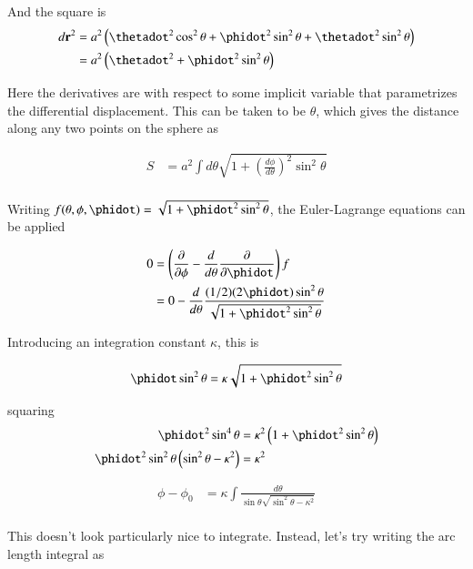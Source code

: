 And the square is
\begin{align*}
d\Br^2
&= a^2 \left( \thetadot^2 \cos^2\theta + \phidot^2 \sin^2\theta + \thetadot^2 \sin^2\theta \right) \\
&= a^2 \left( \thetadot^2 + \phidot^2 \sin^2\theta \right) \\
\end{align*}

Here the derivatives are with respect to some implicit variable that parametrizes the differential displacement.
This can be taken to be $\theta$, which gives the distance along any two points on the sphere as

\begin{align*}
S &= a^2 \int d\theta \sqrt{1 + \left(\frac{d\phi}{d\theta}\right)^2 \sin^2\theta } \\
\end{align*}

Writing $f(\theta, \phi, \phidot) = \sqrt{1 + \phidot^2 \sin^2\theta}$, the Euler-Lagrange equations can be
applied

\begin{align*}
0 
&= \left( \PD{\phi}{} - \frac{d}{d\theta} \PD{\phidot}{} \right) f \\
&= 0 - \frac{d}{d\theta} \frac{(1/2)(2\phidot) \sin^2\theta}{\sqrt{1 + \phidot^2 \sin^2\theta}} \\
\end{align*}

Introducing an integration constant $\kappa$, this is

\begin{align*}
\phidot \sin^2\theta = \kappa \sqrt{1 + \phidot^2 \sin^2\theta}
\end{align*}

squaring
\begin{align*}
\phidot^2 \sin^4\theta &= \kappa^2 \left(1 + \phidot^2 \sin^2\theta \right) \\
\phidot^2 \sin^2\theta \left( \sin^2 \theta - \kappa^2 \right) &= \kappa^2 \\
\end{align*}

\begin{align*}
\phi - \phi_0 &= \kappa \int \frac{d\theta}{\sin\theta \sqrt{ \sin^2 \theta - \kappa^2 }} \\
\end{align*}

This doesn't look particularly nice to integrate.  Instead, let's try writing the arc length integral as

